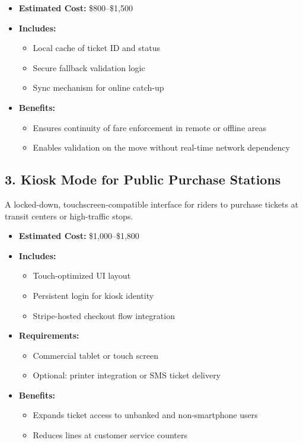 \documentclass[12pt]{article}
\begin{document}
\begin{itemize}
    \item \textbf{Estimated Cost:} \$800–\$1,500
    \item \textbf{Includes:}
    \begin{itemize}
        \item Local cache of ticket ID and status
        \item Secure fallback validation logic
        \item Sync mechanism for online catch-up
    \end{itemize}
    \item \textbf{Benefits:}
    \begin{itemize}
        \item Ensures continuity of fare enforcement in remote or offline areas
        \item Enables validation on the move without real-time network dependency
    \end{itemize}
\end{itemize}

\subsection*{3. Kiosk Mode for Public Purchase Stations}

A locked-down, touchscreen-compatible interface for riders to purchase tickets at transit centers or high-traffic stops.

\begin{itemize}
    \item \textbf{Estimated Cost:} \$1,000–\$1,800
    \item \textbf{Includes:}
    \begin{itemize}
        \item Touch-optimized UI layout
        \item Persistent login for kiosk identity
        \item Stripe-hosted checkout flow integration
    \end{itemize}
    \item \textbf{Requirements:}
    \begin{itemize}
        \item Commercial tablet or touch screen
        \item Optional: printer integration or SMS ticket delivery
    \end{itemize}
    \item \textbf{Benefits:}
    \begin{itemize}
        \item Expands ticket access to unbanked and non-smartphone users
        \item Reduces lines at customer service counters
    \end{itemize}
\end{itemize}
\end{document}
